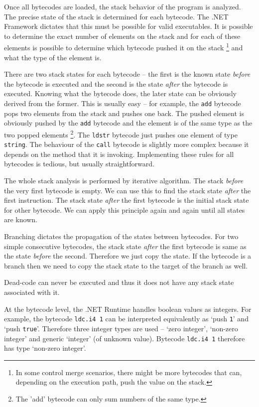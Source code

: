 \documentclass[12pt,twoside,notitlepage]{report}
\begin{document}
Once all bytecodes are loaded, the stack behavior of the program is analyzed.  
The precise state of the stack is determined for each bytecode.
The .NET Framework dictates that this must be possible for valid executables.
It is possible to determine the exact number of elements on the
stack and for each of these elements is possible to determine which bytecode
pushed it on the stack%
\footnote{In some control merge scenarios, there might be more 
bytecodes that can, depending on the execution path, push the value on the stack.}
and what the type of the element is.

There are two stack states for each bytecode -- the first is the known
state \emph{before} the bytecode is executed and the second is the state
\emph{after} the bytecode is executed.  Knowing what the bytecode does,
the later state can be obviously derived from the former.  
This is usually easy -- for example, the \verb|add| bytecode pops 
two elements from the stack and pushes one back.  The pushed element
is obviously pushed by the \verb|add| bytecode 
and the element is of the same type as the two popped elements%
\footnote{The 'add' bytecode can only sum numbers of the same type.}.
The \verb|ldstr| bytecode just pushes one element of type \verb|string|.
The behaviour of the \verb|call| bytecode is slightly more complex 
because it depends on the method that it is invoking.  
Implementing these rules for all bytecodes is
tedious, but usually straightforward.

The whole stack analysis is performed by iterative algorithm.
The stack \emph{before} the very first bytecode is empty.
We can use this to find the stack state \emph{after} the first instruction.
The stack state \emph{after} the first bytecode is the 
initial stack state for other bytecode.
We can apply this principle again and again until all states are known.

Branching dictates the propagation of the states between bytecodes.
For two simple consecutive bytecodes, the stack state \emph{after}
the first bytecode is same as the state \emph{before} the second.
Therefore we just copy the state.
If the bytecode is a branch then we need to copy
the stack state to the target of the branch as well.

Dead-code can never be executed and thus it does not have
any stack state associated with it.

At the bytecode level, the .NET Runtime handles boolean values
as integers.  For example, the bytecode \verb|ldc.i4 1| can
be interpreted equivalently as `push \verb|1|' and `push \verb|true|'.
Therefore three integer types are used -- 
`zero integer', `non-zero integer' and generic `integer' (of
unknown value).  Bytecode \verb|ldc.i4 1| therefore has type 
`non-zero integer'.
\end{document}
